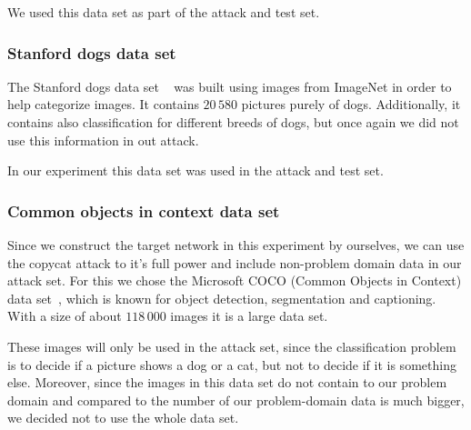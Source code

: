 \documentclass[a4paper,11pt]{article}
\begin{document}
            We used this data set as part of the attack and test set. 
            
        \subsubsection{Stanford dogs data set} \label{subsec:dataset_dogs}
            The Stanford dogs data set ~\cite{dogs} was built using images from ImageNet in order to help categorize images. It contains $20\,580$ pictures purely of dogs. Additionally, it contains also classification for different breeds of dogs, but once again we did not use this information in out attack. 
            
            In our experiment this data set was used in the attack and test set.
            
        \subsubsection{Common objects in context data set}\label{subsec:dataset-coco}
            Since we construct the target network in this experiment by ourselves, we can use the copycat attack to it's full power and include non-problem domain data in our attack set. 
            For this we chose the Microsoft COCO (Common Objects in Context) data set~\cite{coco}, which is known for object detection, segmentation and captioning. With a size of about $118\,000$ images it is a large data set. 
            
            These images will only be used in the attack set, since the classification problem is to decide if a picture shows a dog or a cat, but not to decide if it is something else. Moreover, since the images in this data set do not contain to our problem domain and compared to the number of our problem-domain data is much bigger, we decided not to use the whole data set. 
    
\end{document}
